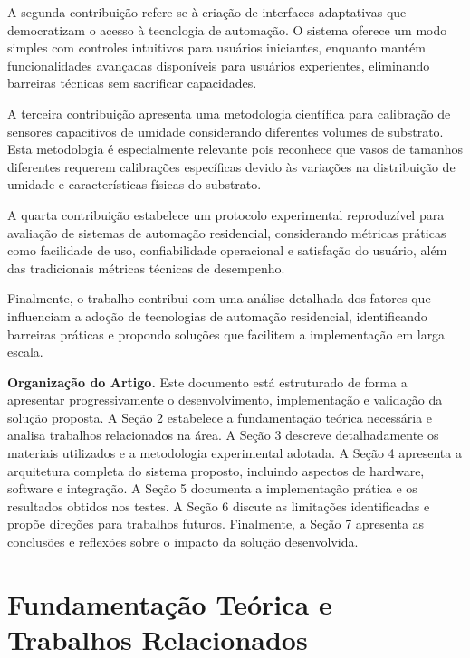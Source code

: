 \documentclass[twoside,english,brazilian]{UNISINOSmonografia}
\begin{document}
A segunda contribuição refere-se à criação de interfaces adaptativas que democratizam o acesso à tecnologia de automação. O sistema oferece um modo simples com controles intuitivos para usuários iniciantes, enquanto mantém funcionalidades avançadas disponíveis para usuários experientes, eliminando barreiras técnicas sem sacrificar capacidades.

A terceira contribuição apresenta uma metodologia científica para calibração de sensores capacitivos de umidade considerando diferentes volumes de substrato. Esta metodologia é especialmente relevante pois reconhece que vasos de tamanhos diferentes requerem calibrações específicas devido às variações na distribuição de umidade e características físicas do substrato.

A quarta contribuição estabelece um protocolo experimental reproduzível para avaliação de sistemas de automação residencial, considerando métricas práticas como facilidade de uso, confiabilidade operacional e satisfação do usuário, além das tradicionais métricas técnicas de desempenho.

Finalmente, o trabalho contribui com uma análise detalhada dos fatores que influenciam a adoção de tecnologias de automação residencial, identificando barreiras práticas e propondo soluções que facilitem a implementação em larga escala.

\noindent\textbf{Organização do Artigo.} Este documento está estruturado de forma a apresentar progressivamente o desenvolvimento, implementação e validação da solução proposta. A Seção 2 estabelece a fundamentação teórica necessária e analisa trabalhos relacionados na área. A Seção 3 descreve detalhadamente os materiais utilizados e a metodologia experimental adotada. A Seção 4 apresenta a arquitetura completa do sistema proposto, incluindo aspectos de hardware, software e integração. A Seção 5 documenta a implementação prática e os resultados obtidos nos testes. A Seção 6 discute as limitações identificadas e propõe direções para trabalhos futuros. Finalmente, a Seção 7 apresenta as conclusões e reflexões sobre o impacto da solução desenvolvida.

\chapter{Fundamentação Teórica e Trabalhos Relacionados}
\end{document}

